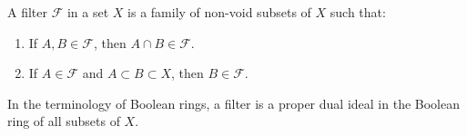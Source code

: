 A filter $\mathcal{F}$ in a set $X$ is a family of non-void subsets of $X$ such that:

\begin{enumerate}
\item[(i)] If $A, B \in \mathcal{F}$, then $A \cap B \in \mathcal{F}$.
\item[(ii)] If $A \in \mathcal{F}$ and $A \subset B \subset X$, then $B \in \mathcal{F}$.
\end{enumerate}

In the terminology of Boolean rings, a filter is a proper dual ideal in the Boolean ring of all subsets of $X$.
